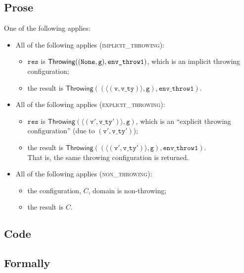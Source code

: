\documentclass{book}
\newcommand\configdomain[1]{\texttt{config\_domain}({#1})}
\newcommand\evalarrow[0]{\stackrel{\mathsf{asl}}{\rightsquigarrow}}
\newcommand\rethrowimplicit[0]{\texttt{rethrow\_implicit}}
\newcommand\valuereadfrom[0]{\textsf{value\_read\_from}}
\newcommand\Throwing[0]{\textsf{Throwing}}
\newcommand\vg[0]{\texttt{g}}
\newcommand\vv[0]{\texttt{v}}
\newcommand\vres[0]{\texttt{res}}
\newcommand\envthrowone[0]{\texttt{env\_throw1}}
\newcommand\vvty[0]{\texttt{v\_ty}}
\newcommand\eid[0]{\texttt{e\_id}}
\begin{document}
\subsection{Prose}
One of the following applies:
\begin{itemize}
  \item All of the following applies (\textsc{implicit\_throwing}):
  \begin{itemize}
    \item $\vres$ is $\Throwing((\None, \vg), \envthrowone)$, which is an implicit throwing configuration;
    \item the result is $\Throwing((\langle(\vv, \vvty)\rangle, \vg), \envthrowone)$.
  \end{itemize}

  \item All of the following applies (\textsc{explicit\_throwing}):
  \begin{itemize}
    \item $\vres$ is $\Throwing(\langle(\vv', \vvty')\rangle, \vg)$, which is an ``explicit throwing configuration''
    (due to $(\vv', \vvty')$);
    \item the result is $\Throwing((\langle(\vv', \vvty')\rangle, \vg), \envthrowone)$. \\
    That is, the same throwing configuration is returned.
  \end{itemize}

  \item All of the following applies (\textsc{non\_throwing}):
  \begin{itemize}
    \item the configuration, $C$, domain is non-throwing;
    \item the result is $C$.
  \end{itemize}
\end{itemize}

\subsection{Code}

\begin{emptyformal}
\subsection{Formally}
\end{emptyformal}
\end{document}
